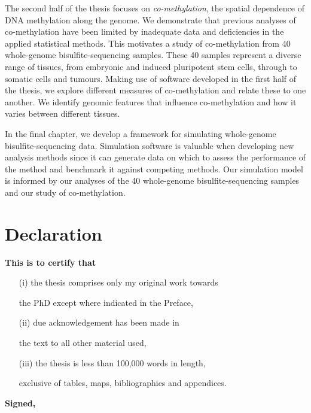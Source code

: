 \documentclass[11pt,a4paper,oneside]{book}	%
\begin{document}
The second half of the thesis focuses on \emph{co-methylation}, the spatial dependence of DNA methylation along the genome. We demonstrate that previous analyses of co-methylation have been limited by inadequate data and deficiencies in the applied statistical methods. This motivates a study of co-methylation from 40 whole-genome bisulfite-sequencing samples. These 40 samples represent a diverse range of tissues, from embryonic and induced pluripotent stem cells, through to somatic cells and tumours. Making use of software developed in the first half of the thesis, we explore different measures of co-methylation and relate these to one another. We identify genomic features that influence co-methylation and how it varies between different tissues.

In the final chapter, we develop a framework for simulating whole-genome bisulfite-sequencing data. Simulation software is valuable when developing new analysis methods since it can generate data on which to assess the performance of the method and benchmark it against competing methods. Our simulation model is informed by our analyses of the 40 whole-genome bisulfite-sequencing samples and our study of co-methylation.


\chapter{Declaration}

{\bf This is to certify that}

\begin{itemize}

\item [(i)] the thesis comprises only my original work towards

the PhD except where indicated in the Preface,

\item [(ii)] due acknowledgement has been made in

the text to all other material used,

\item [(iii)] the thesis is less than 100,000 words in length,

exclusive of tables, maps, bibliographies and appendices.

\end{itemize}



\vspace{2cm}


{\large\bf Signed,\\\\\\\\}
\end{document}
